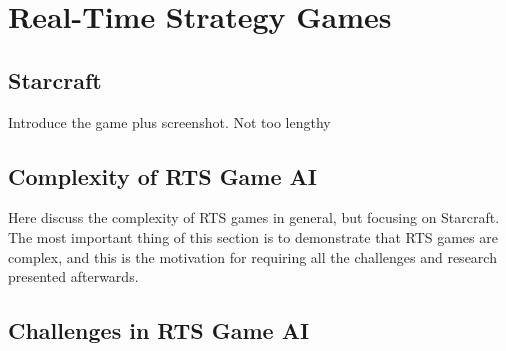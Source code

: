\documentclass[journal]{IEEEtran}
\begin{document}
\section{Real-Time Strategy Games}\label{sec:rts}

\subsection{Starcraft}\label{subsec:starcraft}

{\color{blue}
Introduce the game plus screenshot. Not too lengthy
}

\subsection{Complexity of RTS Game AI}\label{subsec:complexity}

{\color{blue}
Here discuss the complexity of RTS games in general, but focusing on Starcraft. The most important thing of this section is to demonstrate that RTS games are complex, and this is the motivation for requiring all the challenges and research presented afterwards.
}

\subsection{Challenges in RTS Game AI}\label{subsec:challenges}
\end{document}
